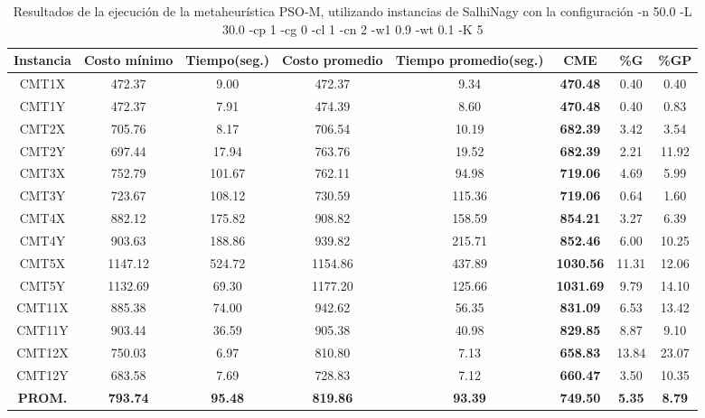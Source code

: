 \begin{table}[h]
\caption{Resultados de la ejecución de la metaheurística PSO-M, utilizando instancias de SalhiNagy con la configuración -n 50.0 -L 30.0 -cp 1 -cg 0 -cl 1 -cn 2 -w1 0.9 -wt 0.1 -K 5}
\centering
\small
\begin{tabular}{c c c c c c c c}
\hline\hline
Instancia & Costo mínimo & Tiempo(seg.) & Costo promedio & Tiempo promedio(seg.) & CME & \%G & \%GP \\ [0.5ex]
\hline
CMT1X & 472.37 & 9.00 & 
472.37 & 9.34 & \bf{470.48} & 
0.40 & 0.40\\CMT1Y & 472.37 & 7.91 & 
474.39 & 8.60 & \bf{470.48} & 
0.40 & 0.83\\CMT2X & 705.76 & 8.17 & 
706.54 & 10.19 & \bf{682.39} & 
3.42 & 3.54\\CMT2Y & 697.44 & 17.94 & 
763.76 & 19.52 & \bf{682.39} & 
2.21 & 11.92\\CMT3X & 752.79 & 101.67 & 
762.11 & 94.98 & \bf{719.06} & 
4.69 & 5.99\\CMT3Y & 723.67 & 108.12 & 
730.59 & 115.36 & \bf{719.06} & 
0.64 & 1.60\\CMT4X & 882.12 & 175.82 & 
908.82 & 158.59 & \bf{854.21} & 
3.27 & 6.39\\CMT4Y & 903.63 & 188.86 & 
939.82 & 215.71 & \bf{852.46} & 
6.00 & 10.25\\CMT5X & 1147.12 & 524.72 & 
1154.86 & 437.89 & \bf{1030.56} & 
11.31 & 12.06\\CMT5Y & 1132.69 & 69.30 & 
1177.20 & 125.66 & \bf{1031.69} & 
9.79 & 14.10\\CMT11X & 885.38 & 74.00 & 
942.62 & 56.35 & \bf{831.09} & 
6.53 & 13.42\\CMT11Y & 903.44 & 36.59 & 
905.38 & 40.98 & \bf{829.85} & 
8.87 & 9.10\\CMT12X & 750.03 & 6.97 & 
810.80 & 7.13 & \bf{658.83} & 
13.84 & 23.07\\CMT12Y & 683.58 & 7.69 & 
728.83 & 7.12 & \bf{660.47} & 
3.50 & 10.35\\\bf{PROM.} & 
\bf{793.74} & \bf{95.48} & \bf{819.86} & \bf{93.39} & \bf{749.50} & \bf{5.35} & \bf{8.79}\\[1ex]\hline
\end{tabular}
\label{table:nonlin}
\end{table}
